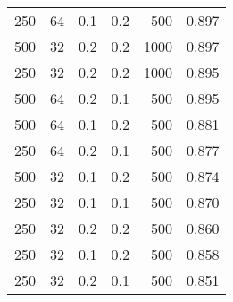 \begin{table}[H]
\begin{tabular}{c|c|c|c|r|c}
    250                                & 64                             & 0.1                         & 0.2                                  & 500                                 & 0.897                  \\
    500                                & 32                             & 0.2                         & 0.2                                  & 1000                                & 0.897                  \\
    250                                & 32                             & 0.2                         & 0.2                                  & 1000                                & 0.895                  \\
    500                                & 64                             & 0.2                         & 0.1                                  & 500                                 & 0.895                  \\
    500                                & 64                             & 0.1                         & 0.2                                  & 500                                 & 0.881                  \\
    250                                & 64                             & 0.2                         & 0.1                                  & 500                                 & 0.877                  \\
    500                                & 32                             & 0.1                         & 0.2                                  & 500                                 & 0.874                  \\
    250                                & 32                             & 0.1                         & 0.1                                  & 500                                 & 0.870                  \\
    250                                & 32                             & 0.2                         & 0.2                                  & 500                                 & 0.860                  \\
    250                                & 32                             & 0.1                         & 0.2                                  & 500                                 & 0.858                  \\
    250                                & 32                             & 0.2                         & 0.1                                  & 500                                 & 0.851                  \\

\end{tabular}
\end{table}
